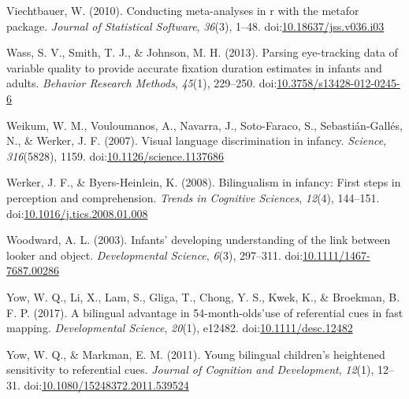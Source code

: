 \documentclass[,man,floatsintext]{apa6}
\begin{document}
\leavevmode\hypertarget{ref-Viechtbauer_2010}{}%
Viechtbauer, W. (2010). Conducting meta-analyses in r with the metafor package. \emph{Journal of Statistical Software}, \emph{36}(3), 1--48. doi:\href{https://doi.org/10.18637/jss.v036.i03}{10.18637/jss.v036.i03}

\leavevmode\hypertarget{ref-Wass_etal_2013}{}%
Wass, S. V., Smith, T. J., \& Johnson, M. H. (2013). Parsing eye-tracking data of variable quality to provide accurate fixation duration estimates in infants and adults. \emph{Behavior Research Methods}, \emph{45}(1), 229--250. doi:\href{https://doi.org/10.3758/s13428-012-0245-6}{10.3758/s13428-012-0245-6}

\leavevmode\hypertarget{ref-Weikum_etal_2007}{}%
Weikum, W. M., Vouloumanos, A., Navarra, J., Soto-Faraco, S., Sebastián-Gallés, N., \& Werker, J. F. (2007). Visual language discrimination in infancy. \emph{Science}, \emph{316}(5828), 1159. doi:\href{https://doi.org/10.1126/science.1137686}{10.1126/science.1137686}

\leavevmode\hypertarget{ref-Werker_Byers-Heinlein_2008}{}%
Werker, J. F., \& Byers-Heinlein, K. (2008). Bilingualism in infancy: First steps in perception and comprehension. \emph{Trends in Cognitive Sciences}, \emph{12}(4), 144--151. doi:\href{https://doi.org/10.1016/j.tics.2008.01.008}{10.1016/j.tics.2008.01.008}

\leavevmode\hypertarget{ref-Woodward_2003}{}%
Woodward, A. L. (2003). Infants' developing understanding of the link between looker and object. \emph{Developmental Science}, \emph{6}(3), 297--311. doi:\href{https://doi.org/10.1111/1467-7687.00286}{10.1111/1467-7687.00286}

\leavevmode\hypertarget{ref-Yow_etal_2017}{}%
Yow, W. Q., Li, X., Lam, S., Gliga, T., Chong, Y. S., Kwek, K., \& Broekman, B. F. P. (2017). A bilingual advantage in 54-month-olds'use of referential cues in fast mapping. \emph{Developmental Science}, \emph{20}(1), e12482. doi:\href{https://doi.org/10.1111/desc.12482}{10.1111/desc.12482}

\leavevmode\hypertarget{ref-Yow_Markman_2011}{}%
Yow, W. Q., \& Markman, E. M. (2011). Young bilingual children's heightened sensitivity to referential cues. \emph{Journal of Cognition and Development}, \emph{12}(1), 12--31. doi:\href{https://doi.org/10.1080/15248372.2011.539524}{10.1080/15248372.2011.539524}

\endgroup
\end{document}
